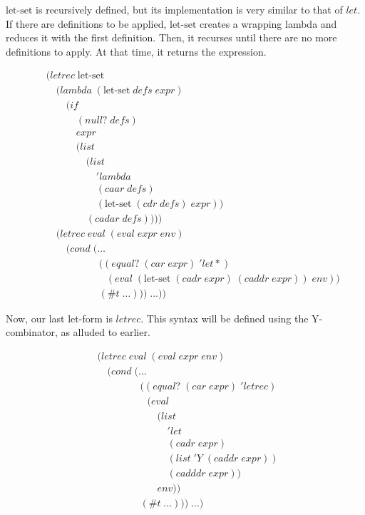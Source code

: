 $\text{let-set}$ is recursively defined, but its implementation is very similar to
that of $let$. If there are definitions to be applied, $\text{let-set}$ creates a
wrapping lambda and reduces it with the first definition. Then, it recurses
until there are no more definitions to apply. At that time, it returns the
expression.

\begin{figure}[htp]
\footnotesize
\caption{}\label{fig:letSetDef}
\begin{align*}
& (letrec \; \text{let-set} \; 
\\& \quad (lambda \; (\text{let-set} \; defs \; expr)
\\& \qquad (if
\\& \qquad \quad (null? \; defs)
\\& \qquad \quad expr
\\& \qquad \quad (list \; 
\\& \qquad \qquad (list \; 
\\& \qquad \qquad \quad 'lambda \; 
\\& \qquad \qquad \quad (caar \; defs) \; 
\\& \qquad \qquad \quad (\text{let-set} \; (cdr \; defs) \; expr)) \; 
\\& \qquad \qquad (cadar \; defs))))
\\& \quad (letrec \; eval \; (eval \; expr \; env)
\\& \qquad (cond \; (\dots
\\& \qquad \qquad \quad \; ((equal? \; (car \; expr) \; 'let*) \; 
\\& \qquad \qquad \qquad (eval \; (\text{let-set} \; (cadr \; expr) \; (caddr \; expr)) \; env))
\\& \qquad \qquad \quad \; (\#t \; \dots))) \; \dots))
\end{align*}
\end{figure}

Now, our last let-form is $letrec$. This syntax will be defined using the Y-
combinator, as alluded to earlier.

\begin{figure}[htp]
\footnotesize
\caption{}\label{fig:letRecDef}
\begin{align*}
& (letrec \; eval \; (eval \; expr \; env)
\\& \quad (cond \; (\dots
\\& \qquad \qquad \; ((equal? \; (car \; expr) \; 'letrec)
\\& \qquad \qquad \quad (eval
\\& \qquad \qquad \qquad (list \; 
\\& \qquad \qquad \qquad \quad 'let \; 
\\& \qquad \qquad \qquad \quad (cadr \; expr) \; 
\\& \qquad \qquad \qquad \quad (list \; 'Y \; (caddr \; expr)) \; 
\\& \qquad \qquad \qquad \quad (cadddr \; expr))
\\& \qquad \qquad \qquad env))
\\& \qquad \qquad \; (\#t \; \dots))) \; \dots)
\end{align*}
\end{figure}

